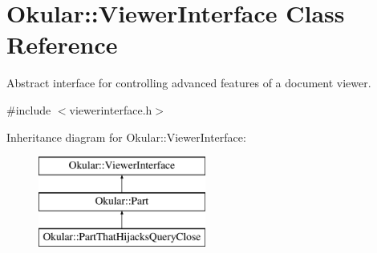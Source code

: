 \hypertarget{classOkular_1_1ViewerInterface}{\section{Okular\+:\+:Viewer\+Interface Class Reference}
\label{classOkular_1_1ViewerInterface}
}


Abstract interface for controlling advanced features of a document viewer.  




{\ttfamily \#include $<$viewerinterface.\+h$>$}

Inheritance diagram for Okular\+:\+:Viewer\+Interface\+:\begin{figure}[H]
\begin{center}
\leavevmode
\includegraphics[height=3.000000cm]{classOkular_1_1ViewerInterface}
\end{center}
\end{figure}
